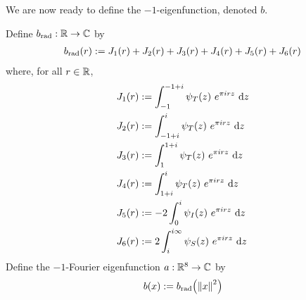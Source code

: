 We are now ready to define the $-1$-eigenfunction, denoted $b$.

\begin{boxdefinition}\label{Ch4:Def:b}
    Define $b_{\operatorname{rad}} : \mathbb{R} \to \mathbb{C}$ by
    \begin{align}
        b_{\operatorname{rad}}\!\left( r \right) := J_1(r) + J_2(r) + J_3(r) + J_4(r) + J_5(r) + J_6(r)
        \label{Ch4:Eq:b_rad_def}
    \end{align}
    where, for all $r \in \mathbb{R}$,
    \begin{align}
        J_1(r) &:= \int_{-1}^{-1 + i} \psi_T\of{z} \,
                                 e^{\pi i r z} \,
                                 \diff{z}
            \label{Ch4:Eq:J_1_def} \\
        J_2(r) &:= \int_{-1 + i}^{i} \psi_T\of{z} \,
                                 e^{\pi i r z} \,
                                 \diff{z}
            \label{Ch4:Eq:J_2_def} \\
        J_3(r) &:= \int_{1}^{1 + i} \psi_T\of{z} \,
                                e^{\pi i r z} \,
                                \diff{z}
            \label{Ch4:Eq:J_3_def} \\
        J_4(r) &:= \int_{1 + i}^{i} \psi_T\of{z} \,
                                e^{\pi i r z} \,
                                \diff{z}
            \label{Ch4:Eq:J_4_def} \\
        J_5(r) &:= -2 \int_{0}^{i} \psi_I\of{z} \,
                                e^{\pi i r z} \,
                                \diff{z}
            \label{Ch4:Eq:J_5_def} \\
        J_6(r) &:= 2 \int_{i}^{i \infty} \psi_S\of{z} \,
                                e^{\pi i r z} \,
                                \diff{z}
            \label{Ch4:Eq:J_6_def}
    \end{align}
    Define the $-1$-Fourier eigenfunction $a : \mathbb{R}^8 \to \mathbb{C}$ by
    \begin{align}
        b(x) := b_{\operatorname{rad}}\!\left( \left\lVert x \right\rVert^2 \right)
            \label{Ch4:Eq:b_def}
    \end{align}
\end{boxdefinition}

